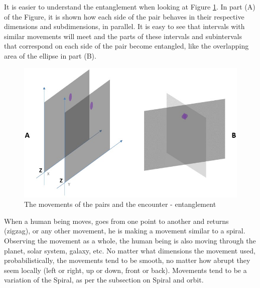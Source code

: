 It is easier to understand the entanglement when looking at Figure \ref{fig:consciousness_space_dimensions}. In part (A) of the Figure, it is shown how each side of the pair behaves in their respective dimensions and subdimensions, in parallel. It is easy to see that intervals with similar movements will meet and the parts of these intervals and subintervals that correspond on each side of the pair become entangled, like the overlapping area of the ellipse in part (B).
	\begin{figure}[H]
	\caption{The movements of the pairs and the encounter - entanglement}
	\label{fig:consciousness_space_dimensions}
	\centering
	\includegraphics[scale=.7]{sections/images/consciousness_space_dimensions.jpg}
	\end{figure}

When a human being moves, goes from one point to another and returns (zigzag), or any other movement, he is making a movement similar to a spiral. Observing the movement as a whole, the human being is also moving through the planet, solar system, galaxy, etc. No matter what dimensions the movement used, probabilistically, the movements tend to be smooth, no matter how abrupt they seem locally (left or right, up or down, front or back). Movements tend to be a variation of the Spiral, as per the subsection on Spiral and orbit.

